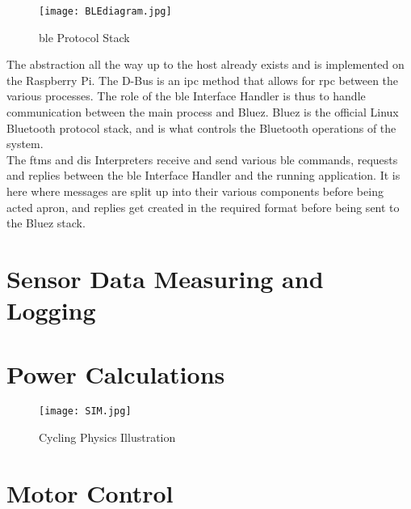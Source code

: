 \begin{figure}[H]
	\begin{center}
		\texttt{[image: BLEdiagram.jpg]}
		\caption{\ac{ble} Protocol Stack}
		\label{fig:blez}
	\end{center}
\end{figure}

The abstraction all the way up to the host already exists and is implemented on the Raspberry Pi. The D-Bus is an \ac{ipc} method that allows for \ac{rpc} between the various processes. The role of the \ac{ble} Interface Handler is thus to handle communication between the main process and Bluez. Bluez is the official Linux Bluetooth protocol stack, and is what controls the Bluetooth operations of the system. \citep{Lee:2020}\\

The \ac{ftms} and \ac{dis} Interpreters receive and send various \ac{ble} commands, requests and replies between the \ac{ble} Interface Handler and the running application. It is here where messages are split up into their various components before being acted apron, and replies get created in the required format before being sent to the Bluez stack.

\newpage

\section{Sensor Data Measuring and Logging}

\newpage

\section{Power Calculations}

\begin{figure}[H]
	\begin{center}
		\texttt{[image: SIM.jpg]}
		\caption{Cycling Physics Illustration}
		\label{fig:sim}
	\end{center}
\end{figure}

\newpage

\section{Motor Control}

